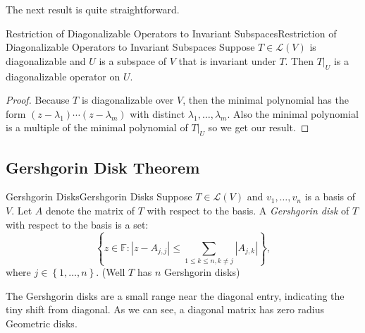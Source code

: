 \documentclass[../main.tex]{subfiles}
\begin{document}
The next result is quite straightforward.
\begin{proposition}{Restriction of Diagonalizable Operators to Invariant Subspaces}{Restriction of Diagonalizable Operators to Invariant Subspaces}
Suppose $T\in \mathscr{L}(V)$ is diagonalizable and $U$ is a subspace of $V$ that is invariant under $T$. Then $T|_U$ is a diagonalizable operator on $U$.
\end{proposition}
\begin{proof}
Because $T$ is diagonalizable over $V$, then the minimal polynomial has the form $(z-\lambda_1)\cdots (z-\lambda_m)$ with distinct $\lambda_1, \ldots ,\lambda_m$. Also the minimal polynomial is a multiple of the minimal polynomial of $T|_U$ so we get our result.
\end{proof}

\subsection{Gershgorin Disk Theorem}
\begin{definition}{Gershgorin Disks}{Gershgorin Disks}
Suppose $T\in \mathscr{L}(V)$ and  $v_1, \ldots ,v_n$ is a basis of $V$. Let $A$ denote the matrix of $T$ with respect to the basis. A \emph{Gershgorin disk} of $T$ with respect to the basis is a set:
\begin{equation}
\left\{ z\in \mathbb{F}: \left|z-A_{j,j}\right|\leq \sum_{1\leq k\leq n,k\neq j} \left|A_{j,k}\right| \right\},
\end{equation}
where $j\in \left\{ 1, \ldots ,n \right\}$. (Well $T$ has $n$ Gershgorin disks)
\end{definition}

The Gershgorin disks are a small range near the diagonal entry, indicating the tiny shift from diagonal. As we can see, a diagonal matrix has zero radius Geometric disks.
\end{document}
